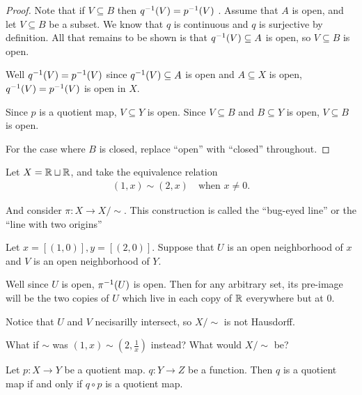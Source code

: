 \documentclass[12pt, twosided]{article}
\begin{document}
\begin{proof}
  Note that if \(V \subseteq B\) then \(q^{-1}(V) = p^{-1}(V)\) . Assume that \(A\) is open, and let \(V \subseteq B\) be a subset. We know that \(q\) is continuous and \(q\) is surjective by definition. All that remains to be shown is that \(q^{-1}(V) \subseteq A\) is open, so \(V \subseteq B\) is open.

  Well \(q^{-1}(V) = p^{-1}(V)\) since \(q^{-1}(V) \subseteq A\) is open and \(A \subseteq X\) is open, \(q^{-1}(V) = p^{-1}(V)\) is open in \(X\).

  Since \(p\) is a quotient map, \(V \subseteq Y\) is open. Since \(V \subseteq B\) and \(B \subseteq Y\) is open, \(V \subseteq B\) is open.

  For the case where \(B\) is closed, replace ``open'' with ``closed'' throughout.
\end{proof}

\begin{exa}
  Let \(X = \mathbb{R} \sqcup \mathbb{R}\), and take the equivalence relation
  \begin{align*}
    (1, x) \sim (2, x) \quad \text{when } x \neq 0.
  \end{align*}

  And consider \(\pi: X \to X/\sim\). This construction is called the ``bug-eyed line'' or the ``line with two origins''

  Let \(x = [(1, 0)], y = [(2,0)]\). Suppose that \(U\)  is an open neighborhood of \(x\) and \(V\) is an open neighborhood of \(Y\).

  Well since \(U\) is open, \(\pi^{-1}(U)\) is open. Then for any arbitrary set, its pre-image will be the two copies of \(U\) which live in each copy of \(\mathbb{R}\) everywhere but at \(0\).

  Notice that \(U\) and \(V\) necisarilly intersect, so \(X/ \sim\) is not Hausdorff.
\end{exa}

\begin{ques}
  What if \(\sim\) was \((1,x) \sim \left(2, \frac{1}{x}\right)\) instead? What would \(X/ \sim\) be?
\end{ques}

\begin{lm}
  Let \(p: X \to Y\) be a quotient map. \(q: Y \to Z\) be a function. Then \(q\) is a quotient map if and only if \(q \circ p\) is a quotient map.
\end{lm}
\end{document}
